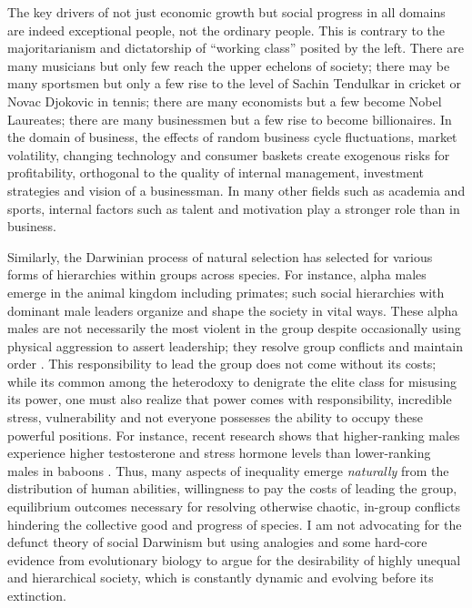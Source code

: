 \documentclass[12pt]{article}
\newcommand{\1}{\mathbbm 1}
\begin{document}
	    The key drivers of not just economic growth but social progress in all domains are indeed exceptional people, not the ordinary people. This is contrary to the majoritarianism and dictatorship of ``working class'' posited by the left. There are many musicians but only few reach the upper echelons of society; there may be many sportsmen but only a few rise to the level of Sachin Tendulkar in cricket or Novac Djokovic in tennis; there are many economists but a few become Nobel Laureates; there are many businessmen but a few rise to become billionaires. In the domain of business, the effects of random business cycle fluctuations, market volatility, changing technology and consumer baskets create exogenous risks for profitability, orthogonal to the quality of internal management, investment strategies and vision of a businessman. In many other fields such as academia and sports, internal factors such as talent and motivation play a stronger role than in business. 
	    
	    
	    Similarly, the Darwinian process of natural selection has selected for various forms of hierarchies within groups across species. For instance, alpha males emerge in the animal kingdom including primates; such social hierarchies with dominant male leaders organize and shape the society in vital ways. These alpha males are not necessarily the most violent in the group despite occasionally using physical aggression to assert leadership; they resolve group conflicts and maintain order \cite{peterson2002maps}. This responsibility to lead the group does not come without its costs; while its common among the heterodoxy to denigrate the elite class for misusing its power, one must also realize that power comes with responsibility, incredible stress, vulnerability and not everyone possesses the ability to occupy these powerful positions. For instance, recent research shows that higher-ranking males experience higher testosterone and stress hormone levels than lower-ranking males in baboons \cite{gesquiere2011life}. Thus, many aspects of inequality emerge \textit{naturally} from the distribution of human abilities, willingness to pay the costs of leading the group, equilibrium outcomes necessary for resolving otherwise chaotic, in-group conflicts hindering the collective good and progress of species. I am not advocating for the defunct theory of social Darwinism but using analogies and some hard-core evidence from evolutionary biology to argue for the desirability of highly unequal and hierarchical society, which is constantly dynamic and evolving before its extinction.
	    
\end{document}
